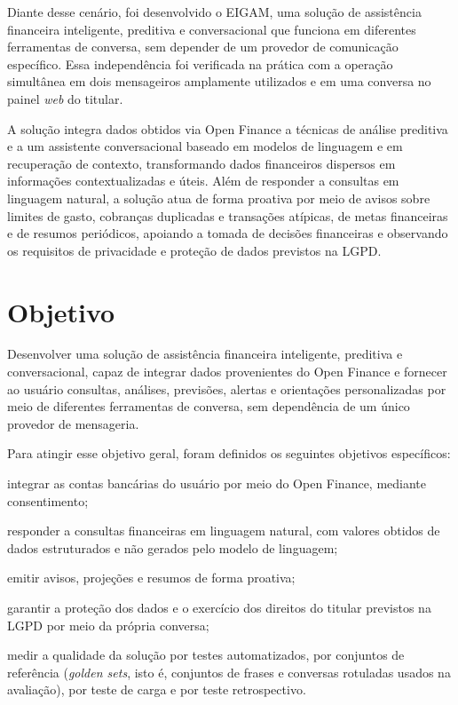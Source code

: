 Diante desse cenário, foi desenvolvido o EIGAM, uma solução de assistência financeira inteligente, preditiva e conversacional que funciona em diferentes ferramentas de conversa, sem depender de um provedor de comunicação específico. Essa independência foi verificada na prática com a operação simultânea em dois mensageiros amplamente utilizados e em uma conversa no painel \textit{web} do titular.

A solução integra dados obtidos via Open Finance a técnicas de análise preditiva e a um assistente conversacional baseado em modelos de linguagem e em recuperação de contexto, transformando dados financeiros dispersos em informações contextualizadas e úteis. Além de responder a consultas em linguagem natural, a solução atua de forma proativa por meio de avisos sobre limites de gasto, cobranças duplicadas e transações atípicas, de metas financeiras e de resumos periódicos, apoiando a tomada de decisões financeiras e observando os requisitos de privacidade e proteção de dados previstos na LGPD.

\section{Objetivo}

Desenvolver uma solução de assistência financeira inteligente, preditiva e conversacional, capaz de integrar dados provenientes do Open Finance e fornecer ao usuário consultas, análises, previsões, alertas e orientações personalizadas por meio de diferentes ferramentas de conversa, sem dependência de um único provedor de mensageria.

Para atingir esse objetivo geral, foram definidos os seguintes objetivos específicos:

\begin{alineas}
    \item integrar as contas bancárias do usuário por meio do Open Finance, mediante consentimento;
    \item responder a consultas financeiras em linguagem natural, com valores obtidos de dados estruturados e não gerados pelo modelo de linguagem;
    \item emitir avisos, projeções e resumos de forma proativa;
    \item garantir a proteção dos dados e o exercício dos direitos do titular previstos na LGPD por meio da própria conversa;
    \item medir a qualidade da solução por testes automatizados, por conjuntos de referência (\textit{golden sets}, isto é, conjuntos de frases e conversas rotuladas usados na avaliação), por teste de carga e por teste retrospectivo.
\end{alineas}

